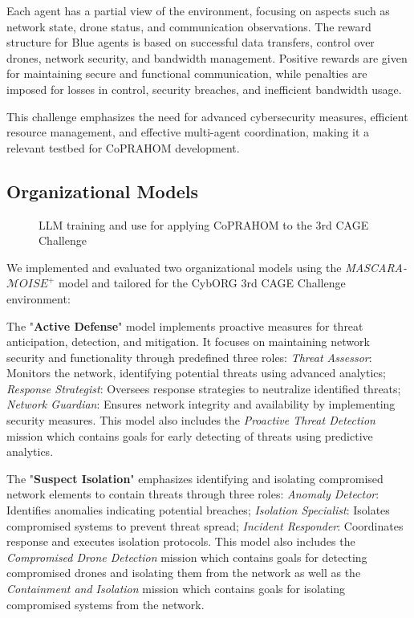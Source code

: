 \documentclass[conference]{IEEEtran}
\begin{document}
Each agent has a partial view of the environment, focusing on aspects such as network state, drone status, and communication observations. The reward structure for Blue agents is based on successful data transfers, control over drones, network security, and bandwidth management. Positive rewards are given for maintaining secure and functional communication, while penalties are imposed for losses in control, security breaches, and inefficient bandwidth usage.

This challenge emphasizes the need for advanced cybersecurity measures, efficient resource management, and effective multi-agent coordination, making it a relevant testbed for CoPRAHOM development.

\subsection{Organizational Models}

\begin{figure}[h!]
    \centering
    
    \caption{LLM training and use for applying CoPRAHOM to the 3rd CAGE Challenge}\label{fig:llm_process}
\end{figure}


We implemented and evaluated two organizational models using the \textit{MASCARA-$\mathcal{M}OISE^+$} model and tailored for the CybORG 3rd CAGE Challenge environment:

The "\textbf{Active Defense}" model implements proactive measures for threat anticipation, detection, and mitigation. It focuses on maintaining network security and functionality through predefined three roles:
%
\textit{Threat Assessor}: Monitors the network, identifying potential threats using advanced analytics;
\textit{Response Strategist}: Oversees response strategies to neutralize identified threats;
\textit{Network Guardian}: Ensures network integrity and availability by implementing security measures.
%
This model also includes the \textit{Proactive Threat Detection} mission which contains goals for early detecting of threats using predictive analytics.

The "\textbf{Suspect Isolation}" emphasizes identifying and isolating compromised network elements to contain threats through three roles:
%
\textit{Anomaly Detector}: Identifies anomalies indicating potential breaches;
\textit{Isolation Specialist}: Isolates compromised systems to prevent threat spread;
\textit{Incident Responder}: Coordinates response and executes isolation protocols.
%
This model also includes the \textit{Compromised Drone Detection} mission which contains goals for detecting compromised drones and isolating them from the network as well as the \textit{Containment and Isolation} mission which contains goals for isolating compromised systems from the network.
\end{document}
